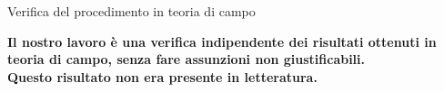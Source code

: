 \documentclass[10pt,compress]{beamer}
\begin{document}
\begin{frame}{Verifica del procedimento in teoria di campo}
\begin{center}
{\large \bfseries  
Il nostro lavoro è una \alert{verifica indipendente} dei risultati ottenuti in teoria di campo, senza fare \alert{assunzioni} non giustificabili.
\\[0.3cm]
{\alert{Questo risultato non era presente in letteratura}.
}
} 
\\
\vspace{0.5cm}
\\
\end{center}



\end{frame}



\nocite{*}
%

\end{document}

